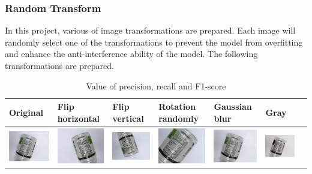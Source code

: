\documentclass{article}
\begin{document}
        \subsubsection*{Random Transform}
        In this project, various of image transformations are prepared. Each image will randomly select one of the transformations to prevent the model from overfitting and enhance the anti-interference ability of the model. The following transformations are prepared.
        
        \begin{table}[!h]
            \centering
            \begin{tabular}{ |p{1.5cm}|p{1.5cm}|p{1.5cm}|p{1.5cm}|p{1.5cm}|p{1.5cm}|p{1.5cm}|  }
                \hline
                    Original & Flip horizontal & Flip vertical & Rotation randomly & Gaussian blur & Gray \\
                \hline
                    \includegraphics[scale=0.85]{ori.png} & \includegraphics[scale=0.85]{flip_hrz.png} & \includegraphics[scale=0.85]{flip_vert.png} &
                    \includegraphics[scale=0.85]{rotation_rand.png} &
                    \includegraphics[scale=0.85]{gaussian_blur.png} &
                    \includegraphics[scale=0.85]{gray.png}\\
                \hline
            \end{tabular}
            \caption{Value of precision, recall and F1-score}
            \label{tab:pre_rec_f1}
        \end{table}
        
\end{document}

